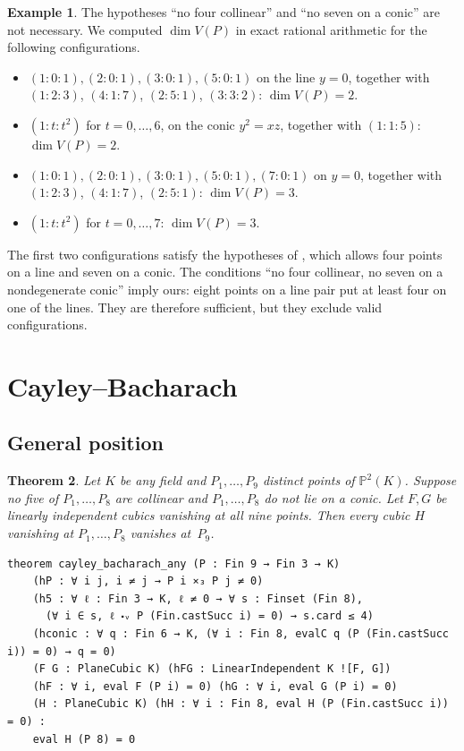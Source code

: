 \documentclass[11pt]{article}
\newtheorem{theorem}{Theorem}
\theoremstyle{definition}
\newtheorem{example}[theorem]{Example}
\theoremstyle{remark}
\newcommand{\PP}{\mathbb{P}}
\begin{document}
\begin{example}\label{ex:criterion}
The hypotheses ``no four collinear'' and ``no seven on a conic'' are not necessary. We computed
$\dim V(P)$ in exact rational arithmetic for the following configurations.
\begin{itemize}
\item $(1:0:1),(2:0:1),(3:0:1),(5:0:1)$ on the line $y=0$, together with $(1:2:3)$, $(4:1:7)$,
$(2:5:1)$, $(3:3:2)$: $\dim V(P)=2$.
\item $(1:t:t^2)$ for $t=0,\dots,6$, on the conic $y^2=xz$, together with $(1:1:5)$:
$\dim V(P)=2$.
\item $(1:0:1),(2:0:1),(3:0:1),(5:0:1),(7:0:1)$ on $y=0$, together with $(1:2:3)$, $(4:1:7)$,
$(2:5:1)$: $\dim V(P)=3$.
\item $(1:t:t^2)$ for $t=0,\dots,7$: $\dim V(P)=3$.
\end{itemize}
The first two configurations satisfy the hypotheses of ,
which allows four points on a line and seven on a conic. The conditions ``no four collinear, no
seven on a nondegenerate conic'' imply ours: eight points on a line pair put at least four on
one of the lines. They are therefore sufficient, but they exclude valid configurations.
\end{example}

\section{Cayley--Bacharach}\label{sec:cb}

\subsection{General position}

\begin{theorem}\label{thm:gp}
Let $K$ be any field and $P_1,\dots,P_9$ distinct points of $\PP^2(K)$. Suppose no five of
$P_1,\dots,P_8$ are collinear and $P_1,\dots,P_8$ do not lie on a conic. Let $F,G$ be linearly
independent cubics vanishing at all nine points. Then every cubic $H$ vanishing at
$P_1,\dots,P_8$ vanishes at~$P_9$.
\end{theorem}

\begin{lstlisting}
theorem cayley_bacharach_any (P : Fin 9 → Fin 3 → K)
    (hP : ∀ i j, i ≠ j → P i ⨯₃ P j ≠ 0)
    (h5 : ∀ ℓ : Fin 3 → K, ℓ ≠ 0 → ∀ s : Finset (Fin 8),
      (∀ i ∈ s, ℓ ⬝ᵥ P (Fin.castSucc i) = 0) → s.card ≤ 4)
    (hconic : ∀ q : Fin 6 → K, (∀ i : Fin 8, evalC q (P (Fin.castSucc i)) = 0) → q = 0)
    (F G : PlaneCubic K) (hFG : LinearIndependent K ![F, G])
    (hF : ∀ i, eval F (P i) = 0) (hG : ∀ i, eval G (P i) = 0)
    (H : PlaneCubic K) (hH : ∀ i : Fin 8, eval H (P (Fin.castSucc i)) = 0) :
    eval H (P 8) = 0
\end{lstlisting}
\end{document}

